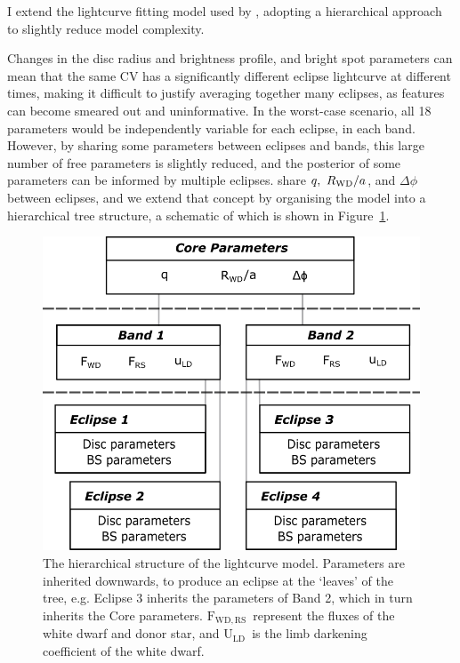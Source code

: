 I extend the lightcurve fitting model used by \citet{McAllister2019}, adopting a hierarchical approach to slightly reduce model complexity. 

Changes in the disc radius and brightness profile, and bright spot parameters can mean that the same CV has a significantly different eclipse lightcurve at different times, making it difficult to justify averaging together many eclipses, as features can become smeared out and uninformative. In the worst-case scenario, all 18 parameters would be independently variable for each eclipse, in each band. However, by sharing some parameters between eclipses and bands, this large number of free parameters is slightly reduced, and the posterior of some parameters can be informed by multiple eclipses. \citet{McAllister2017} share $q,\ R_{\rm WD}/a$, and $\Delta\phi$ between eclipses, and we extend that concept by organising the model into a hierarchical tree structure, a schematic of which is shown in Figure~\ref{fig:method:hierarchical_model}. 

\begin{figure}
    \centering
    \includegraphics[width=.85\columnwidth ]{figures/three_cvs_with_weird_colours/GeneralFigs/hierarchical_model_structure.png}
    \caption{The hierarchical structure of the lightcurve model. Parameters are inherited downwards, to produce an eclipse at the `leaves' of the tree, e.g. Eclipse 3 inherits the parameters of Band 2, which in turn inherits the Core parameters. $\mathrm{F_{WD, RS}}$\ represent the fluxes of the white dwarf and donor star, and $\mathrm{U_{LD}}$\ is the limb darkening coefficient of the white dwarf.}
    \label{fig:method:hierarchical_model}
\end{figure}

